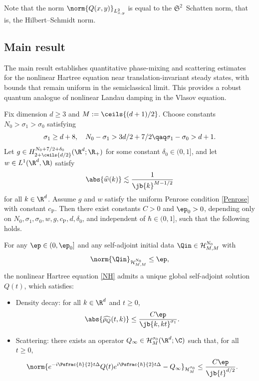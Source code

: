 Note that the norm $\norm{Q(x,y)}_{L^2_{x,y}}$ is equal to the $\mathfrak{S}^2$~Schatten norm, that is, the Hilbert--Schmidt norm.

\subsection{Main result}The main result establishes quantitative phase-mixing and scattering estimates for the nonlinear Hartree equation near translation-invariant steady states, with bounds that remain uniform in the semiclassical limit. This provides a robust quantum analogue of nonlinear Landau damping in the Vlasov equation.
\begin{theorem}\label{maintheorem}
Fix dimension $d\geq3$ and $M:=\ceils{(d+1)/2}$. Choose constants $N_0>\sigma_1>\sigma_0$ satisfying \[\sigma_1\geq d+8,\quad N_0-\sigma_1>3d/2+7/2 \qaq \sigma_1-\sigma_0>d+1.\] Let $g\in H^{N_0+7/2+\delta_0}_{2+\ceils{d/2}}(\R^d;\R_+)$ for some constant $\delta_0\in(0,1]$, and let $w\in L^1(\R^d,\R)$ satisfy
\begin{align}
\abs{\widehat w(k)}\lesssim\frac{1}{\jb{k}^{M-1/2}}\label{wassumption}
\end{align}for all $k\in\R^d$. Assume $g$ and $w$ satisfy the uniform Penrose condition \eqref{Penrose} with constant ${c_{\mathrm{P}}}$. Then there exist constants $C>0$ and $\ep_0>0$, depending only on $N_0,\sigma_1,\sigma_0,w,g,{c_{\mathrm{P}}},d,\delta_0$, and independent of $\hbar\in(0,1]$, such that the following holds.

For any $\ep\in(0,\ep_0]$ and any self-adjoint initial data $\Qin\in\mathcal{H}^{N_0}_{M,M}$ with \[\norm{\Qin}_{\mathcal{H}^{N_0}_{M,M}}\leq\ep,\]
the nonlinear Hartree equation \eqref{NH} admits a unique global self-adjoint solution $Q(t)$, which satisfies:
\begin{itemize}
\item Density decay: for all $k\in\R^d$ and $t\geq 0$,\begin{align}
\label{T1}\abs{\widehat{\rho_Q}(t,k)}&\leq \frac{C\ep}{\jb{k, kt}^{\sigma_1}}.
\end{align}
\item Scattering: there exists an operator $Q_\infty\in\mathcal H^{\sigma_0}_M(\R^d;\C)$ such that, for all $t\geq 0$,
\begin{align}
\label{T2}
\norm{e^{-i\Psfrac{\hbar}{2}t\Delta}Q(t)e^{i\Psfrac{\hbar}{2}t\Delta}-Q_\infty}_{\mathcal H^{\sigma_0}_{M}}&\leq \frac{C\ep}{\jb{t}^{d/2}}.
\end{align}
\end{itemize}
\end{theorem}

